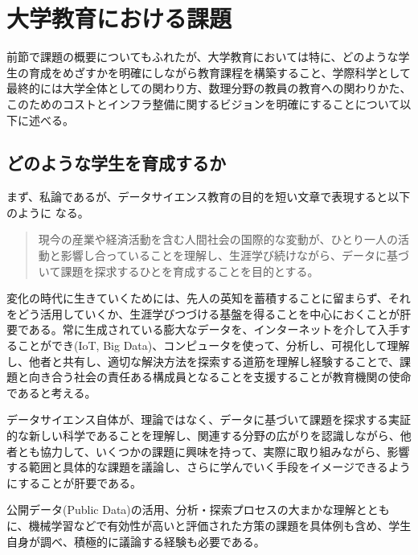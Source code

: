 \documentclass[
]{book}
\theoremstyle{definition}
\theoremstyle{definition}
\theoremstyle{definition}
\theoremstyle{definition}
\theoremstyle{remark}
\begin{document}
\hypertarget{ux5927ux5b66ux6559ux80b2ux306bux304aux3051ux308bux8ab2ux984c}{%
\section{大学教育における課題}\label{ux5927ux5b66ux6559ux80b2ux306bux304aux3051ux308bux8ab2ux984c}}

前節で課題の概要についてもふれたが、大学教育においては特に、どのような学生の育成をめざすかを明確にしながら教育課程を構築すること、学際科学として最終的には大学全体としての関わり方、数理分野の教員の教育への関わりかた、このためのコストとインフラ整備に関するビジョンを明確にすることについて以下に述べる。

\hypertarget{ux3069ux306eux3088ux3046ux306aux5b66ux751fux3092ux80b2ux6210ux3059ux308bux304b}{%
\subsection{どのような学生を育成するか}\label{ux3069ux306eux3088ux3046ux306aux5b66ux751fux3092ux80b2ux6210ux3059ux308bux304b}}

まず、私論であるが、データサイエンス教育の目的を短い文章で表現すると以下のように
なる。

\begin{quote}
現今の産業や経済活動を含む人間社会の国際的な変動が、ひとり一人の活動と影響し合っていることを理解し、生涯学び続けながら、データに基づいて課題を探求するひとを育成することを目的とする。
\end{quote}

変化の時代に生きていくためには、先人の英知を蓄積することに留まらず、それをどう活用していくか、生涯学びつづける基盤を得ることを中心におくことが肝要である。常に生成されている膨大なデータを、インターネットを介して入手することができ(IoT, Big Data)、コンピュータを使って、分析し、可視化して理解し、他者と共有し、適切な解決方法を探索する道筋を理解し経験することで、課題と向き合う社会の責任ある構成員となることを支援することが教育機関の使命であると考える。

データサイエンス自体が、理論ではなく、データに基づいて課題を探求する実証的な新しい科学であることを理解し、関連する分野の広がりを認識しながら、他者とも協力して、いくつかの課題に興味を持って、実際に取り組みながら、影響する範囲と具体的な課題を議論し、さらに学んでいく手段をイメージできるようにすることが肝要である。

公開データ(Public Data)の活用、分析・探索プロセスの大まかな理解とともに、機械学習などで有効性が高いと評価された方策の課題を具体例も含め、学生自身が調べ、積極的に議論する経験も必要である。
\end{document}
